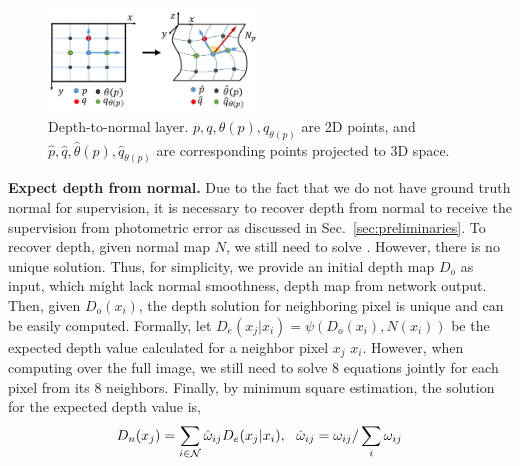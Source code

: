 \begin{figure}
\centering
\includegraphics[width=0.5\textwidth]{figures/d2n.pdf}
\caption{Depth-to-normal layer. $p, q, \theta(p), q_{\theta(p)}$ are 2D points, and $\hat{p}, \hat{q}, \hat{\theta}(p), \hat{q}_{\theta(p)}$ are corresponding points projected to 3D space.}
\vspace{-0.7\baselineskip}
\label{fig:d2n}
\end{figure}

\textbf{Expect depth from normal.} 
Due to the fact that we do not have ground truth normal for supervision, it is necessary to recover depth from normal to receive the supervision from photometric error as discussed in Sec.~\ref{sec:preliminaries}.
To recover depth, given normal map $N$, we still need to solve . However, there is no unique solution. Thus, for simplicity, we provide an initial depth map $D_o$ as input, which might lack normal smoothness, \eg depth map from network output. Then, given $D_o(x_i)$, the depth solution for neighboring pixel is unique and can be easily computed. Formally, let $D_e(x_j | x_i) = \psi(D_o(x_i), N(x_i))$ be the expected depth value calculated for a neighbor pixel $x_j$ \wrt $x_i$. 
However, when computing over the full image, we still need to solve 8 equations jointly for each pixel from its 8 neighbors. Finally, by minimum square estimation, the solution for the expected depth value is,
\begin{align}
\label{eq:depth}
D_n(x_j) = \sum_{i\in{\mathcal N}}\hat{\omega}_{ij}D_e(x_j | x_i), \text{~~}
\hat{\omega}_{ij} = \omega_{ij} / \sum_i{\omega_{ij}}
\end{align}



